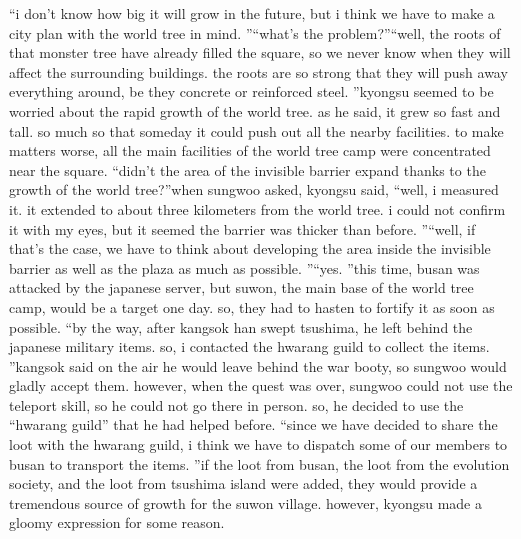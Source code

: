 “i don’t know how big it will grow in the future, but i think we have to make a city plan with the world tree in mind.
”“what’s the problem?”“well, the roots of that monster tree have already filled the square, so we never know when they will affect the surrounding buildings.
 the roots are so strong that they will push away everything around, be they concrete or reinforced steel.
”kyongsu seemed to be worried about the rapid growth of the world tree.
 as he said, it grew so fast and tall.
 so much so that someday it could push out all the nearby facilities.
to make matters worse, all the main facilities of the world tree camp were concentrated near the square.
“didn’t the area of the invisible barrier expand thanks to the growth of the world tree?”when sungwoo asked, kyongsu said, “well, i measured it.
 it extended to about three kilometers from the world tree.
 i could not confirm it with my eyes, but it seemed the barrier was thicker than before.
”“well, if that’s the case, we have to think about developing the area inside the invisible barrier as well as the plaza as much as possible.
”“yes.
”this time, busan was attacked by the japanese server, but suwon, the main base of the world tree camp, would be a target one day.
 so, they had to hasten to fortify it as soon as possible.
“by the way, after kangsok han swept tsushima, he left behind the japanese military items.
 so, i contacted the hwarang guild to collect the items.
”kangsok said on the air he would leave behind the war booty, so sungwoo would gladly accept them.
however, when the quest was over, sungwoo could not use the teleport skill, so he could not go there in person.
 so, he decided to use the “hwarang guild” that he had helped before.
“since we have decided to share the loot with the hwarang guild, i think we have to dispatch some of our members to busan to transport the items.
”if the loot from busan, the loot from the evolution society, and the loot from tsushima island were added, they would provide a tremendous source of growth for the suwon village.
however, kyongsu made a gloomy expression for some reason.


 